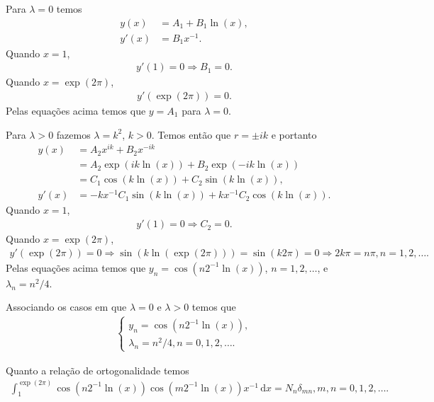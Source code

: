 \documentclass[a4paper,12pt, leqno, answers]{exam}
\begin{document}
\begin{questions}
\begin{solution}
        Para $\lambda = 0$ temos
        \begin{align*}
            y(x) &= A_1 + B_1 \ln(x), \\
            y'(x) & = B_1 x^{-1}.
        \end{align*}
        Quando $x = 1$,
        \begin{align*}
            y'(1) = 0 \Rightarrow B_1 = 0.
        \end{align*}
        Quando $x = \exp(2\pi)$,
        \begin{align*}
            y'(\exp(2\pi)) = 0.
        \end{align*}
        Pelas equa\c{c}\~{o}es acima temos que $y = A_1$ para $\lambda = 0$.

        Para $\lambda > 0$ fazemos $\lambda = k^2$, $k > 0$. Temos ent\~{a}o que $r = \pm i k$ e portanto
        \begin{align*}
            y(x) &= A_2 x^{i k} + B_2 x^{-i k} \\
            &= A_2 \exp(i k \ln(x)) + B_2 \exp(-i k \ln(x)) \\
            &= C_1 \cos(k \ln(x)) + C_2 \sin(k \ln(x)), \\
            y'(x) &= -k x^{-1} C_1 \sin(k \ln(x)) + k x^{-1} C_2 \cos(k \ln(x)).
        \end{align*}
        Quando $x = 1$,
        \begin{align*}
            y'(1) = 0 \Rightarrow C_2 = 0.
        \end{align*}
        Quando $x = \exp(2\pi)$,
        \begin{align*}
            y'(\exp(2\pi)) = 0 \Rightarrow \sin(k \ln(\exp(2\pi))) = \sin(k 2 \pi) = 0 \Rightarrow 2 k \pi = n \pi, n = 1, 2, \ldots.
        \end{align*}
        Pelas equa\c{c}\~{o}es acima temos que $y_n = \cos(n 2^{-1} \ln(x))$, $n = 1, 2, \ldots$, e $\lambda_n = n^2 / 4$.

        Associando os casos em que $\lambda = 0$ e $\lambda > 0$ temos que
        \begin{align*}
            \begin{cases}
                y_n = \cos\left( n 2^{-1} \ln(x) \right), \\
                \lambda_n = n^2 / 4, n = 0, 1, 2, \ldots.
            \end{cases}
        \end{align*}

        Quanto a rela\c{c}\~{a}o de ortogonalidade temos
        \begin{align*}
            \int_1^{\exp(2\pi)} \cos(n 2^{-1} \ln(x)) \cos(m 2^{-1} \ln(x)) x^{-1} \,\mathrm{d}x = N_n \delta_{mn}, m, n = 0, 1, 2, \ldots.
        \end{align*}
    \end{solution}
\end{questions}
\end{document}
